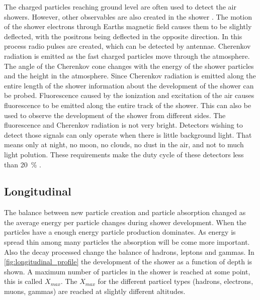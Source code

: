 The charged particles reaching ground level are often used to detect the air showers. However, other observables are also created in the shower \cite{grieder2010eas}. The motion of the shower electrons through Earths magnetic field causes them to be slightly deflected, with the positrons being deflected in the opposite direction. In this process radio pulses are created, which can be detected by antennae. Cherenkov radiation is emitted as the fast charged particles move through the atmosphere. The angle of the Cherenkov cone changes with the energy of the shower particles and the height in the atmosphere. Since Cherenkov radiation is emitted along the entire length of the shower information about the development of the shower can be probed. Fluorescence caused by the ionization and excitation of the air causes fluorescence to be emitted along the entire track of the shower. This can also be used to observe the development of the shower from different sides. The fluorescence and Cherenkov radiation is not very bright. Detectors wishing to detect those signals can only operate when there is little background light. That means only at night, no moon, no clouds, no dust in the air, and not to much light polution. These requirements make the duty cycle of these detectors less than \SI{20}{\percent} \cite{abraham2004auger}.


\subsection{Longitudinal}

The balance between new particle creation and particle absorption changed as the average energy per particle changes during shower development. When the particles have a enough energy particle production dominates. As energy is spread thin among many particles the absorption will be come more important. Also the decay processed change the balance of hadrons, leptons and gammas. In \cref{fig:longitudinal_profile} the development of the shower as a function of depth is shown. A maximum number of particles in the shower is reached at some point, this is called $X_{max}$. The $X_{max}$ for the different particel types (hadrons, electrons, muons, gammas) are reached at slightly different altitudes.

